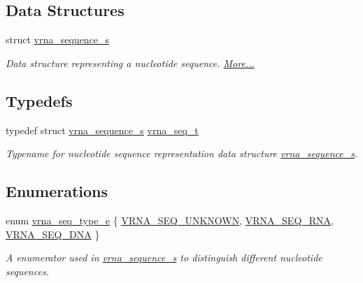 \subsection*{Data Structures}
\begin{DoxyCompactItemize}
\item 
struct \hyperlink{group__alphabet__utils_structvrna__sequence__s}{vrna\+\_\+sequence\+\_\+s}
\begin{DoxyCompactList}\small\item\em Data structure representing a nucleotide sequence.  \hyperlink{group__alphabet__utils_structvrna__sequence__s}{More...}\end{DoxyCompactList}\end{DoxyCompactItemize}
\subsection*{Typedefs}
\begin{DoxyCompactItemize}
\item 
\mbox{\label{group__alphabet__utils_gaa35bee3061759495467070b47d0e1f22}} 
typedef struct \hyperlink{group__alphabet__utils_structvrna__sequence__s}{vrna\+\_\+sequence\+\_\+s} \hyperlink{group__alphabet__utils_gaa35bee3061759495467070b47d0e1f22}{vrna\+\_\+seq\+\_\+t}
\begin{DoxyCompactList}\small\item\em Typename for nucleotide sequence representation data structure \hyperlink{group__alphabet__utils_structvrna__sequence__s}{vrna\+\_\+sequence\+\_\+s}. \end{DoxyCompactList}\end{DoxyCompactItemize}
\subsection*{Enumerations}
\begin{DoxyCompactItemize}
\item 
enum \hyperlink{group__alphabet__utils_ga85cda3fcf5d6bd7ec090d3a96e808609}{vrna\+\_\+seq\+\_\+type\+\_\+e} \{ \hyperlink{group__alphabet__utils_gga85cda3fcf5d6bd7ec090d3a96e808609ad8682ac290d0dd51022e3b82840e1a74}{V\+R\+N\+A\+\_\+\+S\+E\+Q\+\_\+\+U\+N\+K\+N\+O\+WN}, 
\hyperlink{group__alphabet__utils_gga85cda3fcf5d6bd7ec090d3a96e808609ac52309234beaf94e6a3bd1b9b69de9f4}{V\+R\+N\+A\+\_\+\+S\+E\+Q\+\_\+\+R\+NA}, 
\hyperlink{group__alphabet__utils_gga85cda3fcf5d6bd7ec090d3a96e808609a4da1613644c3a3766ef1d6494f271332}{V\+R\+N\+A\+\_\+\+S\+E\+Q\+\_\+\+D\+NA}
 \}\begin{DoxyCompactList}\small\item\em A enumerator used in \hyperlink{group__alphabet__utils_structvrna__sequence__s}{vrna\+\_\+sequence\+\_\+s} to distinguish different nucleotide sequences. \end{DoxyCompactList}
\end{DoxyCompactItemize}
